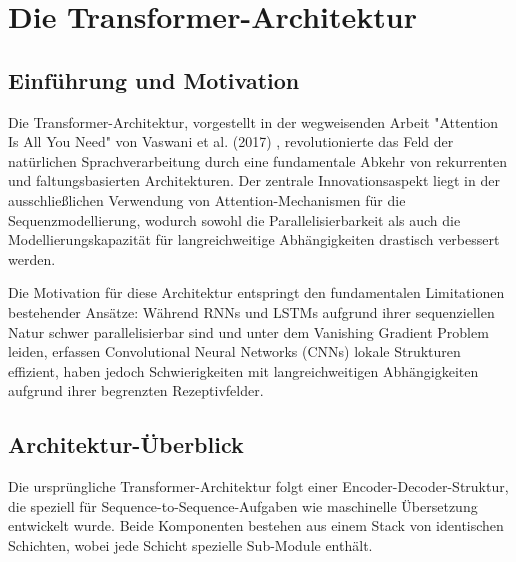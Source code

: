 \chapter{Die Transformer-Architektur}
\label{ch:transformer_architecture}

\section{Einführung und Motivation}

Die Transformer-Architektur, vorgestellt in der wegweisenden Arbeit "Attention Is All You Need" von Vaswani et al. (2017) \cite{vaswani2017attention}, revolutionierte das Feld der natürlichen Sprachverarbeitung durch eine fundamentale Abkehr von rekurrenten und faltungsbasierten Architekturen. Der zentrale Innovationsaspekt liegt in der ausschließlichen Verwendung von Attention-Mechanismen für die Sequenzmodellierung, wodurch sowohl die Parallelisierbarkeit als auch die Modellierungskapazität für langreichweitige Abhängigkeiten drastisch verbessert werden.

Die Motivation für diese Architektur entspringt den fundamentalen Limitationen bestehender Ansätze: Während RNNs und LSTMs aufgrund ihrer sequenziellen Natur schwer parallelisierbar sind und unter dem Vanishing Gradient Problem leiden, erfassen Convolutional Neural Networks (CNNs) lokale Strukturen effizient, haben jedoch Schwierigkeiten mit langreichweitigen Abhängigkeiten aufgrund ihrer begrenzten Rezeptivfelder.

\section{Architektur-Überblick}

Die ursprüngliche Transformer-Architektur folgt einer Encoder-Decoder-Struktur, die speziell für Sequence-to-Sequence-Aufgaben wie maschinelle Übersetzung entwickelt wurde. Beide Komponenten bestehen aus einem Stack von identischen Schichten, wobei jede Schicht spezielle Sub-Module enthält.

